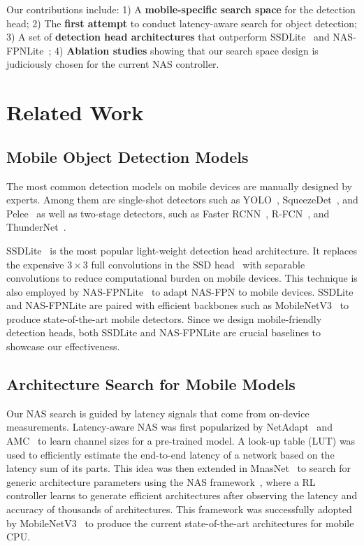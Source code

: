 \documentclass[10pt,twocolumn,letterpaper]{article}
\begin{document}
Our contributions include:
1) A {\bf mobile-specific search space} for the detection head;
2) The {\bf first attempt} to conduct latency-aware search for object detection;
3) A set of {\bf detection head architectures} that outperform SSDLite~\cite{sandler2018mobilenetv2} and NAS-FPNLite~\cite{ghiasi2019fpn};
4) {\bf Ablation studies} showing that our search space design is judiciously chosen for the current NAS controller. 







  
\section{Related Work}
\subsection{Mobile Object Detection Models}
The most common detection models on mobile devices are manually designed by experts. Among them are single-shot detectors such as YOLO~\cite{redmon2016you}, SqueezeDet~\cite{wu2017squeezedet}, and Pelee~\cite{wang2018pelee} as well as two-stage detectors, such as Faster RCNN~\cite{ren2015faster}, R-FCN~\cite{dai2016r}, and ThunderNet~\cite{qin2019thundernet}.

SSDLite~\cite{sandler2018mobilenetv2} is the most popular light-weight detection head architecture. It replaces the expensive $3\times3$ full convolutions in the SSD head~\cite{liu2016ssd} with separable convolutions to reduce computational burden on mobile devices. This technique is also employed by NAS-FPNLite~\cite{ghiasi2019fpn} to adapt NAS-FPN to mobile devices. SSDLite and NAS-FPNLite are paired with efficient backbones such as MobileNetV3~\cite{howard2019searching} to produce state-of-the-art mobile detectors. Since we design mobile-friendly detection heads, both SSDLite and NAS-FPNLite are crucial baselines to showcase our effectiveness.


\subsection{Architecture Search for Mobile Models}
Our NAS search is guided by latency signals that come from on-device measurements. Latency-aware NAS was first popularized by NetAdapt~\cite{yang2018netadapt} and AMC~\cite{he2018amc} to learn channel sizes for a pre-trained model. A look-up table (LUT) was used to efficiently estimate the end-to-end latency of a network based on the latency sum of its parts. This idea was then extended in MnasNet~\cite{tan2019mnasnet} to search for generic architecture parameters using the NAS framework~\cite{zoph2016neural}, where a RL controller learns to generate efficient architectures after observing the latency and accuracy of thousands of architectures. This framework was successfully adopted by MobileNetV3~\cite{howard2019searching} to produce the current state-of-the-art architectures for mobile CPU.  
\end{document}
